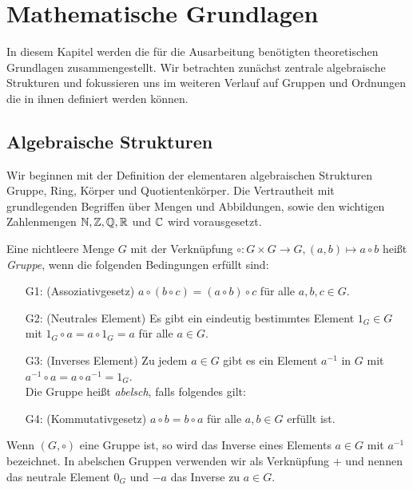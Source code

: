 \chapter{Mathematische Grundlagen}
In diesem Kapitel werden die für die Ausarbeitung benötigten theoretischen Grundlagen zusammengestellt. Wir betrachten zunächst zentrale algebraische Strukturen und fokussieren uns im weiteren Verlauf auf Gruppen und Ordnungen die in ihnen definiert werden können.
\section{Algebraische Strukturen}
Wir beginnen mit der Definition der elementaren algebraischen Strukturen Gruppe, Ring, Körper und Quotientenkörper. Die Vertrautheit mit grundlegenden Begriffen über Mengen und Abbildungen, sowie den wichtigen Zahlenmengen $\mathbb{N}, \mathbb{Z}, \mathbb{Q}, \mathbb{R}$ und $\mathbb{C}$ wird vorausgesetzt. 
%
\begin{defn}\label{Gruppe}
Eine nichtleere Menge $G$ mit der Verknüpfung $\circ \colon G \times G \rightarrow G, \left( a, b\right) \mapsto a \circ b$ heißt \textit{Gruppe}, wenn die folgenden Bedingungen erfüllt sind:
\begin{enumerate}
\item[G1: ] (Assoziativgesetz) $a\circ \left(b\circ c\right) = \left(a\circ b\right) \circ c$ für alle $a, b, c \in G$.
\item[G2: ] (Neutrales Element) Es gibt ein eindeutig bestimmtes Element $1_G \in G$ mit $1_G \circ a  = a \circ 1_G = a$ für alle $a \in G$.
\item[G3: ] (Inverses Element) Zu jedem $a \in G$ gibt es ein Element $a^{-1}$ in $G$ mit $a^{-1} \circ a = a \circ a^{-1} = 1_G$. \\
Die Gruppe heißt \textit{abelsch}, falls folgendes gilt: 
\item[G4: ] (Kommutativgesetz) $a \circ b = b \circ a$ für alle $a, b \in G$ erfüllt ist.  
\end{enumerate} 
\end{defn}
%
%
\begin{bem}
Wenn $\left(G, \circ\right)$ eine Gruppe ist, so wird das Inverse eines Elements $a\in G$ mit $a^{-1}$ bezeichnet. In abelschen Gruppen verwenden wir als Verknüpfung $+$ und nennen das neutrale Element $0_G$ und $-a$ das Inverse zu $a\in G$. 
\end{bem}
